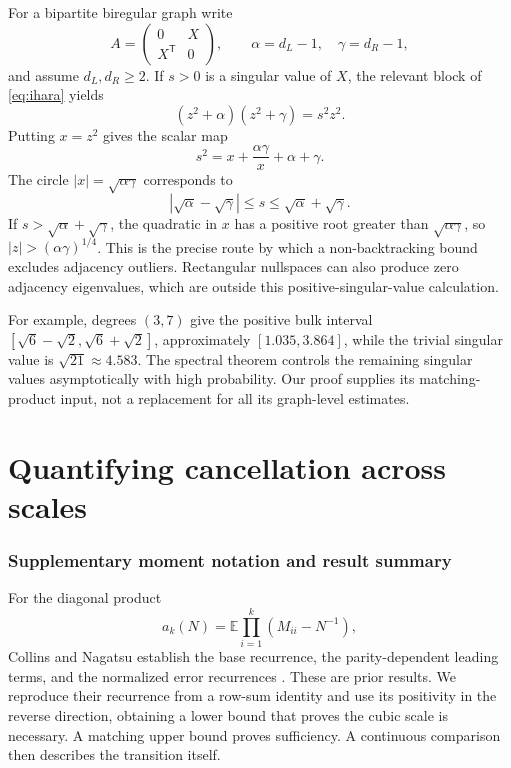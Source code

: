 \documentclass[11pt]{article}
\theoremstyle{definition}
\theoremstyle{remark}
\newcommand{\E}{\mathbb E}
\newcommand{\1}{\mathbf 1}
\begin{document}
For a bipartite biregular graph write
\[
A=\begin{pmatrix}0&X\\X^{\mathsf T}&0\end{pmatrix},\qquad
\alpha=d_L-1,\quad\gamma=d_R-1,
\]
and assume $d_L,d_R\ge2$. If $s>0$ is a singular value of $X$, the relevant block of \eqref{eq:ihara} yields
\begin{equation}\label{eq:biregularbridge}
(z^2+\alpha)(z^2+\gamma)=s^2z^2.
\end{equation}
Putting $x=z^2$ gives the scalar map
\begin{equation}\label{eq:scalarbridge}
s^2=x+\frac{\alpha\gamma}{x}+\alpha+\gamma.
\end{equation}
The circle $|x|=\sqrt{\alpha\gamma}$ corresponds to
\[
|\sqrt\alpha-\sqrt\gamma|\le s\le\sqrt\alpha+\sqrt\gamma.
\]
If $s>\sqrt\alpha+\sqrt\gamma$, the quadratic in $x$ has a positive root greater than $\sqrt{\alpha\gamma}$, so $|z|>(\alpha\gamma)^{1/4}$. This is the precise route by which a non-backtracking bound excludes adjacency outliers. Rectangular nullspaces can also produce zero adjacency eigenvalues, which are outside this positive-singular-value calculation.

For example, degrees $(3,7)$ give the positive bulk interval $[\sqrt6-\sqrt2,\sqrt6+\sqrt2]$, approximately $[1.035,3.864]$, while the trivial singular value is $\sqrt{21}\approx4.583$. The spectral theorem controls the remaining singular values asymptotically with high probability. Our proof supplies its matching-product input, not a replacement for all its graph-level estimates.



\clearpage
\clearpage
\part{Quantifying cancellation across scales}
\section{Supplementary moment notation and result summary}\label{sec:moment-summary}

For the diagonal product
\[
a_k(N)=\E\prod_{i=1}^k(M_{ii}-N^{-1}),
\]
Collins and Nagatsu establish the base recurrence, the parity-dependent leading terms, and the normalized error recurrences \cite[Proposition 3.3]{CN}. These are prior results. We reproduce their recurrence from a row-sum identity and use its positivity in the reverse direction, obtaining a lower bound that proves the cubic scale is necessary. A matching upper bound proves sufficiency. A continuous comparison then describes the transition itself.
\end{document}
